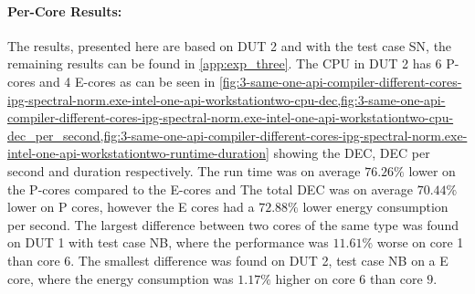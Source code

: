 \paragraph{Per-Core Results:} The results, presented here are based on DUT 2 and with the test case SN, the remaining results can be found in \cref{app:exp_three}. The CPU in DUT 2 has 6 P-cores and 4 E-cores as can be seen in \cref{fig:3-same-one-api-compiler-different-cores-ipg-spectral-norm.exe-intel-one-api-workstationtwo-cpu-dec,fig:3-same-one-api-compiler-different-cores-ipg-spectral-norm.exe-intel-one-api-workstationtwo-cpu-dec_per_second,fig:3-same-one-api-compiler-different-cores-ipg-spectral-norm.exe-intel-one-api-workstationtwo-runtime-duration} showing the DEC, DEC per second and duration respectively. The run time was on average $76.26\%$ lower on the P-cores compared to the E-cores and The total DEC was on average $70.44\%$ lower on P cores, however the E cores had a $72.88\%$ lower energy consumption per second. %
The largest difference between two cores of the same type was found on DUT 1 with test case NB, where the performance was $11.61\%$ worse on core 1 than core 6. The smallest difference was found on DUT 2, test case NB on a E core, where the energy consumption was $1.17\%$ higher on core $6$ than core $9$.







